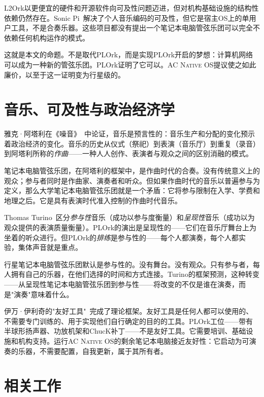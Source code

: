 \documentclass[10pt,letterpaper,twocolumn]{article}
\newcommand{\acos}{\textsc{AC Native OS}}
\begin{document}
L2Ork以更便宜的硬件和开源软件向可及性问题迈进，但对机构基础设施的结构性依赖仍然存在。Sonic Pi~\citep{aaron2016sonic}解决了个人音乐编码的可及性，但它是宿主OS上的单用户工具，不是合奏乐器。这些项目都没有提出一个笔记本电脑管弦乐团可以完全不依赖任何机构运作的模式。

这就是本文的命题。不是取代PLOrk，而是实现PLOrk开启的梦想：计算机网络可以成为一种新的管弦乐团。PLOrk证明了它可以。\acos{}提议使之如此廉价，以至于这一证明变为行星级的。


\section{音乐、可及性与政治经济学}
\label{sec:theory}

雅克·阿塔利在《噪音》~\citep{attali1985noise}中论证，音乐是预言性的：音乐生产和分配的变化预示着政治经济的变化。音乐的历史从仪式（祭祀）到表演（音乐厅）到重复（录音）到阿塔利所称的\emph{作曲}——一种人人创作、表演者与观众之间的区别消融的模式。

笔记本电脑管弦乐团，在阿塔利的框架中，是作曲时代的合奏。没有传统意义上的观众；参与者同时是作曲家、演奏者和听众。但如果作曲时代的音乐以普遍参与为定义，那么大学笔记本电脑管弦乐团就是一个矛盾：它将参与限制在入学、学费和地理之后。它是具有表演时代准入控制的作曲时代音乐。

Thomas Turino~\citep{turino2008music}区分\emph{参与性}音乐（成功以参与度衡量）和\emph{呈现性}音乐（成功以为观众提供的表演质量衡量）。PLOrk的演出是呈现性的——它们在音乐厅舞台上为坐着的听众进行。但PLOrk的\emph{排练}是参与性的——每个人都演奏，每个人都实验，集体声音就是重点。

行星笔记本电脑管弦乐团默认是参与性的。没有舞台。没有观众。只有参与者，每人拥有自己的乐器，在他们选择的时间和方式连接。Turino的框架预测，这种转变——从呈现性笔记本电脑管弦乐团到参与性——将改变的不仅是谁在演奏，而是"演奏"意味着什么。

伊万·伊利奇的"友好工具"~\citep{illich1973tools}完成了理论框架。友好工具是任何人都可以使用的、不需要专门训练的、用于实现他们自行确定的目的的工具。PLOrk工位——带有半球形扬声器、功放机架和ChucK补丁——不是友好工具。它需要培训、基础设施和机构支持。运行\acos{}的剩余笔记本电脑接近友好性：它启动为可演奏的乐器，不需要配置，自我更新，属于其所有者。


\section{相关工作}
\label{sec:related}
\end{document}
